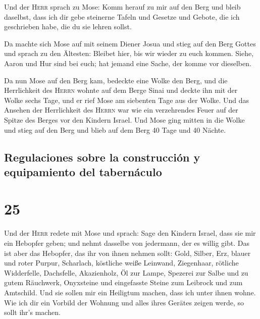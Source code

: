  Und der \textsc{Herr} sprach zu Mose: Komm herauf zu mir
auf den Berg und bleib daselbst, dass ich dir gebe steinerne Tafeln und
Gesetze und Gebote, die ich geschrieben habe, die du sie lehren sollst.

 Da machte sich Mose auf mit seinem Diener Josua und
stieg auf den Berg Gottes  und sprach zu den Ältesten:
Bleibet hier, bis wir wieder zu euch kommen. Siehe, Aaron und Hur sind
bei euch; hat jemand eine Sache, der komme vor dieselben.

 Da nun Mose auf den Berg kam, bedeckte eine Wolke den
Berg,  und die Herrlichkeit des \textsc{Herrn} wohnte auf
dem Berge Sinai und deckte ihn mit der Wolke sechs Tage, und er rief
Mose am siebenten Tage aus der Wolke.  Und das Ansehen
der Herrlichkeit des \textsc{Herrn} war wie ein verzehrendes Feuer auf
der Spitze des Berges vor den Kindern Israel.  Und Mose
ging mitten in die Wolke und stieg auf den Berg und blieb auf dem Berg
40 Tage und 40 Nächte.

\hypertarget{regulaciones-sobre-la-construcciuxf3n-y-equipamiento-del-tabernuxe1culo}{%
\subsection{Regulaciones sobre la construcción y equipamiento del
tabernáculo}\label{regulaciones-sobre-la-construcciuxf3n-y-equipamiento-del-tabernuxe1culo}}

\hypertarget{section-24}{%
\section{25}\label{section-24}}

 Und der \textsc{Herr} redete mit Mose und sprach:
 Sage den Kindern Israel, dass sie mir ein Hebopfer geben;
und nehmt dasselbe von jedermann, der es willig gibt.  Das
ist aber das Hebopfer, das ihr von ihnen nehmen sollt: Gold, Silber,
Erz,  blauer und roter Purpur, Scharlach, köstliche weiße
Leinwand, Ziegenhaar,  rötliche Widderfelle, Dachsfelle,
Akazienholz,  Öl zur Lampe, Spezerei zur Salbe und zu
gutem Räuchwerk,  Onyxsteine und eingefasste Steine zum
Leibrock und zum Amtschild.  Und sie sollen mir ein
Heiligtum machen, dass ich unter ihnen wohne.  Wie ich dir
ein Vorbild der Wohnung und alles ihres Gerätes zeigen werde, so sollt
ihr's machen.

